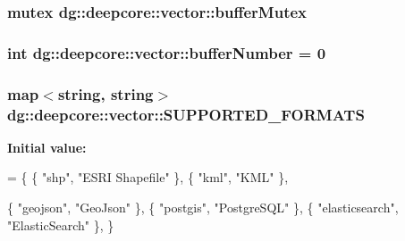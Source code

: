 \subsubsection[{\texorpdfstring{buffer\+Mutex}{bufferMutex}}]{\setlength{\rightskip}{0pt plus 5cm}mutex dg\+::deepcore\+::vector\+::buffer\+Mutex\hspace{0.3cm}{\ttfamily [static]}}\hypertarget{namespacedg_1_1deepcore_1_1vector_ad7a8cd187c2310e6fbec1c46bc5ca5a5}{}\label{namespacedg_1_1deepcore_1_1vector_ad7a8cd187c2310e6fbec1c46bc5ca5a5}
\subsubsection[{\texorpdfstring{buffer\+Number}{bufferNumber}}]{\setlength{\rightskip}{0pt plus 5cm}int dg\+::deepcore\+::vector\+::buffer\+Number = 0\hspace{0.3cm}{\ttfamily [static]}}\hypertarget{namespacedg_1_1deepcore_1_1vector_a0ea54c7d7ed3423c8bdc5b777e19a1a3}{}\label{namespacedg_1_1deepcore_1_1vector_a0ea54c7d7ed3423c8bdc5b777e19a1a3}
\subsubsection[{\texorpdfstring{S\+U\+P\+P\+O\+R\+T\+E\+D\+\_\+\+F\+O\+R\+M\+A\+TS}{SUPPORTED_FORMATS}}]{\setlength{\rightskip}{0pt plus 5cm}map$<$string, string$>$ dg\+::deepcore\+::vector\+::\+S\+U\+P\+P\+O\+R\+T\+E\+D\+\_\+\+F\+O\+R\+M\+A\+TS\hspace{0.3cm}{\ttfamily [static]}}\hypertarget{namespacedg_1_1deepcore_1_1vector_ae8c82b697aef9d6329705ab30268c18c}{}\label{namespacedg_1_1deepcore_1_1vector_ae8c82b697aef9d6329705ab30268c18c}
{\bfseries Initial value\+:}
\begin{DoxyCode}
= \{
    \{ \textcolor{stringliteral}{"shp"},  \textcolor{stringliteral}{"ESRI Shapefile"} \},
    \{ \textcolor{stringliteral}{"kml"},  \textcolor{stringliteral}{"KML"} \},
    
    \{ \textcolor{stringliteral}{"geojson"}, \textcolor{stringliteral}{"GeoJson"} \},
    \{ \textcolor{stringliteral}{"postgis"}, \textcolor{stringliteral}{"PostgreSQL"} \},
    \{ \textcolor{stringliteral}{"elasticsearch"}, \textcolor{stringliteral}{"ElasticSearch"} \},
\}
\end{DoxyCode}

